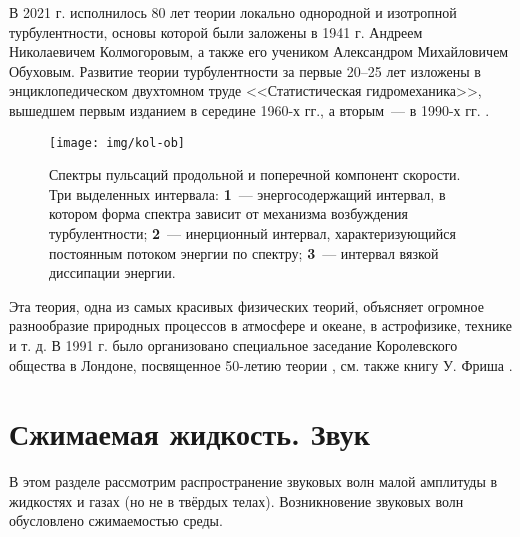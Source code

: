 В 2021 г. исполнилось 80 лет теории локально однородной и изотропной турбулентности, основы которой были заложены в 1941 г. Андреем Николаевичем Колмогоровым, а также его учеником Александром Михайловичем Обуховым. Развитие теории турбулентности за первые 20--25 лет изложены в энциклопедическом двухтомном труде <<Статистическая гидромеханика>>, вышедшем первым изданием в середине 1960-х гг., а вторым~--- в 1990-х гг. \cite{m22}.
\begin{figure}[H]
	\centering
	\texttt{[image: img/kol-ob]}
	\caption{Спектры пульсаций продольной и поперечной компонент скорости. Три выделенных интервала: \textbf{1}~--- энергосодержащий интервал, в котором форма спектра зависит от механизма возбуждения турбулентности; \textbf{2}~--- инерционный интервал, характеризующийся постоянным потоком энергии по спектру; \textbf{3}~--- интервал вязкой диссипации энергии.}
	\label{fig:spectrepulsac}
\end{figure}
Эта теория, одна из самых красивых физических теорий, объясняет огромное разнообразие природных процессов в атмосфере и океане, в астрофизике, технике и т. д. В 1991 г. было организовано специальное заседание Королевского общества в Лондоне, посвященное 50-летию теории \cite{m23}, см. также книгу У. Фриша \cite{m24}.

\newpage
{}
\section{Сжимаемая жидкость. Звук}

В этом разделе рассмотрим распространение звуковых волн малой амплитуды в жидкостях и газах (но не в твёрдых телах). Возникновение звуковых волн обусловлено сжимаемостью среды.

